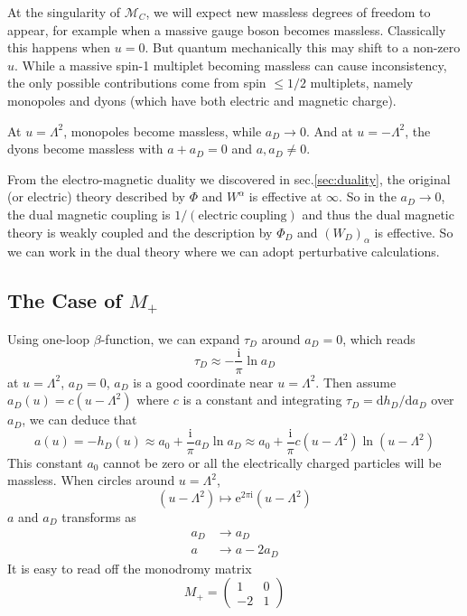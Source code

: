 \documentclass{article}
\begin{document}
At the singularity of $\mathscr{M}_C$, we will expect new massless degrees of freedom to appear, for example when a massive gauge boson becomes massless. Classically this happens when $u=0$. But quantum mechanically this may shift to a non-zero $u$. While a massive spin-1 multiplet becoming massless can cause inconsistency, the only possible contributions come from spin $\leq 1/2$ multiplets, namely monopoles and dyons (which have both electric and magnetic charge). 

At $u=\Lambda^2$, monopoles become massless, while $a_D\to0$. And at $u=-\Lambda^2$, the dyons become massless with $a+a_D=0$ and $a,a_D\neq 0$.

From the electro-magnetic duality we discovered in sec.\ref{sec:duality}, the original (or electric) theory described by $\Phi$ and $W^\alpha$ is effective at $\infty$. So in the $a_D \to 0$, the dual magnetic coupling is $1/(\mathrm{electric\ coupling})$ and thus the dual magnetic theory is weakly coupled and the description by $\Phi_D$ and $(W_D)_\alpha$ is effective. So we can work in the dual theory where we can adopt perturbative calculations.

\subsection{The Case of $M_+$}
Using one-loop $\beta$-function, we can expand $\tau_D$ around $a_D=0$, which reads
\begin{equation}
\tau_{D} \approx-\frac{\mathrm{i}}{\pi} \ln a_{D}
\end{equation}
at $u=\Lambda^2$, $a_D=0$, $a_D$ is a good coordinate near $u=\Lambda^2$. Then assume $a_D(u)=c(u-\Lambda^2)$ where $c$ is a constant and integrating $\tau_D=\mathrm{d}h_D/\mathrm{d}a_D$ over $a_D$, we can deduce that 
\begin{equation}
a(u)=-h_{D}(u) \approx a_{0}+\frac{\mathrm{i}}{\pi} a_{D} \ln a_{D} \approx a_{0}+\frac{\mathrm{i}}{\pi} c\left(u-\Lambda^2\right) \ln \left(u-\Lambda^2\right)
\end{equation}
This constant $a_0$ cannot be zero or all the electrically charged particles will be massless. When circles around $u=\Lambda^2$,
\begin{equation}
    (u-\Lambda^2)\mapsto \mathrm{e}^{2\pi\mathrm{i}}(u-\Lambda^2)
\end{equation}
$a$ and $a_D$ transforms as
\begin{equation}
\begin{aligned}
a_{D} & \rightarrow a_{D} \\
a & \rightarrow a-2 a_{D}
\end{aligned}
\end{equation}
It is easy to read off the monodromy matrix
\begin{equation}
M_{+}=\left(\begin{array}{cc}
1 & 0 \\
-2 & 1
\end{array}\right)
\end{equation}
\end{document}
